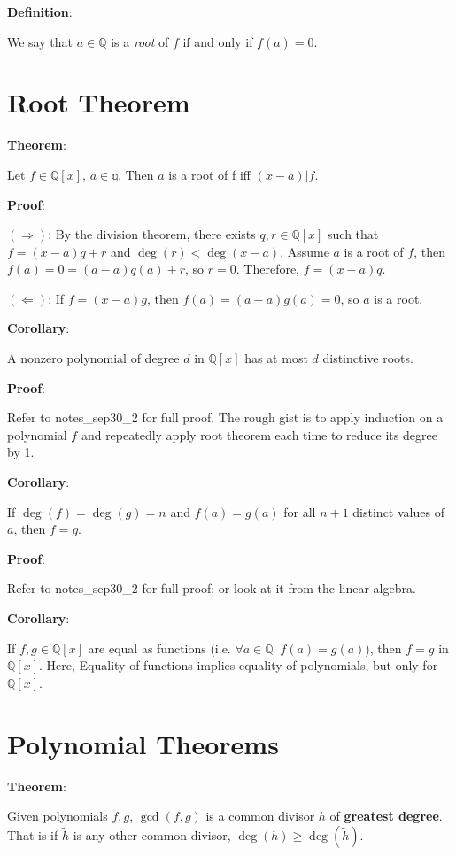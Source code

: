 \documentclass{article}
\begin{document}
\begin{multicols*}{2}
\textbf{Definition}:

We say that $a \in \mathbb{Q}$ is a \textit{root} of $f$ if and only if $f(a) = 0$.

\section{Root Theorem}

\textbf{Theorem}:

Let $f \in \mathbb{Q}[x]$, $a \in \mathbb{q}$. Then $a$ is a root of f iff $(x-a)|f$.

\textbf{Proof}:

$(\Rightarrow)$: By the division theorem, there exists $q, r \in \mathbb{Q}[x]$ such that $f = (x-a)q + r$ and $\deg(r) < \deg(x-a)$. Assume $a$ is a root of $f$, then $f(a) = 0 = (a - a)q(a) + r$, so $r = 0$. Therefore, $f = (x-a)q$.

$(\Leftarrow)$: If $f = (x - a) g$, then $f(a) = (a - a)g(a) = 0$, so $a$ is a root.

\textbf{Corollary}:

A nonzero polynomial of degree $d$ in $\mathbb{Q}[x]$ has at most $d$ distinctive roots.

\textbf{Proof}:

Refer to notes\_sep30\_2 for full proof. The rough gist is to apply induction on a polynomial $f$ and repeatedly apply root theorem each time to reduce its degree by 1.

\textbf{Corollary}:

If $\deg(f) = \deg(g) = n$ and $f(a) = g(a)$ for all $n+1$ distinct values of $a$, then $f = g$.

\textbf{Proof}:

Refer to notes\_sep30\_2 for full proof; or look at it from the linear algebra.

\textbf{Corollary}:

If $f, g \in \mathbb{Q}[x]$ are equal as functions (i.e. $\forall a \in \mathbb{Q}\;\;f(a) = g(a)$), then $f=g$ in $\mathbb{Q}[x]$. Here, Equality of functions implies equality of polynomials, but only for $\mathbb{Q}[x]$.

\section{Polynomial Theorems}


\textbf{Theorem}:

Given polynomials $f, g$, $\gcd(f, g)$ is a common divisor $h$ of \textbf{greatest degree}. That is if $\tilde{h}$ is any other common divisor, $\deg(h) \geq \deg(\tilde{h})$.


\end{multicols*}
\end{document}
